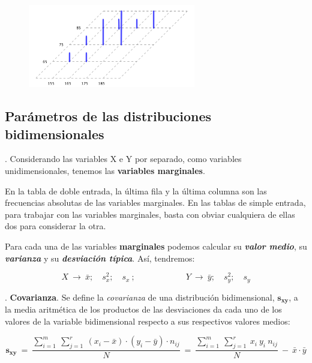 \begin{definition}
	\begin{figure}[H]
			\centering
			\includegraphics[width=0.65\textwidth]{imagenes/imagenes03/T03IM03.png}
	\end{figure}

\end{definition}




\subsection{Parámetros de las distribuciones bidimensionales}


\begin{definition}
. Considerando las variables X e Y por separado, como variables unidimensionales, tenemos las \textbf{variables marginales}.

\vspace{2mm} \begin{small} En la tabla de doble entrada, la última fila y la última columna son las frecuencias absolutas de las variables marginales. En las tablas de simple entrada, para trabajar con las variables marginales, basta con obviar cualquiera de ellas dos para considerar la otra. \end{small}

\vspace{2mm} Para cada una de las variables \textbf{marginales} podemos calcular su \textbf{\emph{valor medio}}, su \textbf{\emph{varianza}} y su \textbf{\emph{desviación típica}}. Así, tendremos:

$$X\ \to \ \bar x;\quad s^2_x;\quad s_x\ ;\qquad \qquad \qquad
Y\ \to \ \bar y;\quad s^2_y;\quad s_y$$
\end{definition}

\begin{definition}
.	\textbf{Covarianza}.  Se define la \emph{covarianza} de una distribución bidimensional, $\boldsymbol{s_{xy}}$, a la media aritmética de los productos de las desviaciones da cada uno de los valores de la variable bidimensional respecto a sus respectivos valores medios:

$$\boldsymbol{s_{xy}} \ = \ 
\dfrac{ \displaystyle \sum_{i=1}^m \ \sum_{j=1}^r \ (x_i-\bar x)\cdot (y_i-\bar y) \cdot n_{ij}}{N} \ = \ 
\dfrac{\displaystyle \sum_{i=1}^m \ \sum_{j=1}^r \ x_i \ y_i \  n_{ij}}{N} \ - \ \bar x \cdot \bar y$$
\end{definition}

